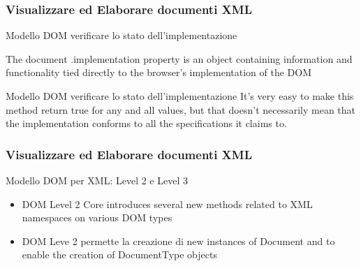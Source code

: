 \begin{frame}
    \frametitle{Visualizzare ed Elaborare documenti XML}
    \addtocounter{nframe}{1}
    

     \begin{block}{Modello DOM verificare lo stato dell'implementazione}
        
        The document .implementation property is an object containing information and functionality tied directly to the browser’s implementation of the DOM
     \end{block}

     \begin{block}{Modello DOM verificare lo stato dell'implementazione}
        It’s very easy to make this method return true for any and all values, but that doesn’t necessarily mean that the implementation conforms to all the specifications it claims to.
     \end{block}
     
\end{frame}


\begin{frame}
    \frametitle{Visualizzare ed Elaborare documenti XML}
    \addtocounter{nframe}{1}
    

     \begin{block}{Modello DOM per XML: Level 2 e Level 3}
        \begin{itemize}
            \item  DOM Level 2 Core introduces several new methods related to XML namespaces on various DOM types
            \item DOM Leve 2 permette la creazione di new instances of Document and to enable the creation of DocumentType objects
        \end{itemize}
       
     \end{block}

     
\end{frame}

